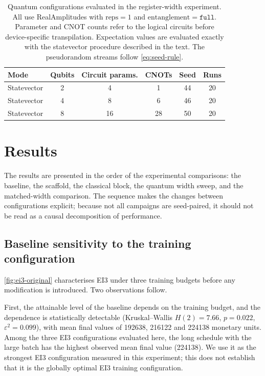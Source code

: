\documentclass[aps,floatfix,superscriptaddress,twocolumn,tightenlines,amsmath,amssymb,nofootinbib,10pt,longbibliography,prl]{revtex4-2}
\begin{document}
\begin{table}[htbp]
  \centering
  \caption{Quantum configurations evaluated in the register-width experiment. All use RealAmplitudes with $\mathrm{reps}=1$ and $\mathrm{entanglement}=\texttt{full}$. Parameter and CNOT counts refer to the logical circuits before device-specific transpilation. Expectation values are evaluated exactly with the statevector procedure described in the text. The pseudorandom streams follow \ref{eq:seed-rule}.}
  \label{tab:quantum-configs}
  \begin{tabular}{lccccc}
    \toprule
    Mode & Qubits & Circuit params. & CNOTs & Seed & Runs \\
    \midrule
    Statevector & 2 & 4  & 1  & 44 & 20 \\
    Statevector & 4 & 8  & 6  & 46 & 20 \\
    Statevector & 8 & 16 & 28 & 50 & 20 \\
    \bottomrule
  \end{tabular}
\end{table}

\section{Results}
\label{sec:results}

The results are presented in the order of the experimental comparisons: the baseline, the scaffold, the classical block, the quantum width sweep, and the matched-width comparison. The sequence makes the changes between configurations explicit; because not all campaigns are seed-paired, it should not be read as a causal decomposition of performance.

\subsection{Baseline sensitivity to the training configuration}
\label{subsec:res-baseline}

\ref{fig:ei3-original} characterises EI3 under three training budgets before any modification is introduced. Two observations follow.

First, the attainable level of the baseline depends on the training budget, and the dependence is statistically detectable (Kruskal--Wallis $H(2) = 7.66$, $p = 0.022$, $\varepsilon^2 = 0.099$), with mean final values of \num{192638}, \num{216122} and \num{224138} monetary units. Among the three EI3 configurations evaluated here, the long schedule with the large batch has the highest observed mean final value (\num{224138}). We use it as the strongest EI3 configuration measured in this experiment; this does not establish that it is the globally optimal EI3 training configuration.
\end{document}
